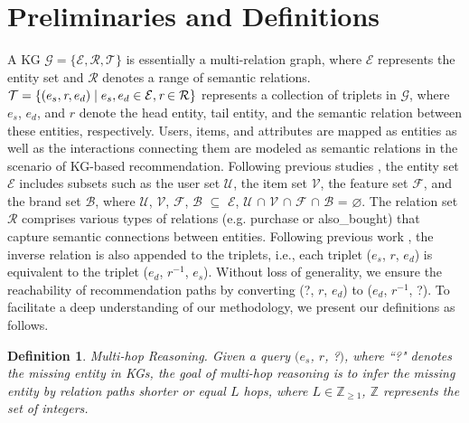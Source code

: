 \documentclass[conference]{IEEEtran}
\newtheorem{defn}{Definition}
\begin{document}
\section{Preliminaries and Definitions}
A KG  
	\begin{math}
		\mathcal{G} = \{\mathcal{E}, \mathcal{R}, \mathcal{T}\} 
	\end{math} is essentially a multi-relation graph, where $\mathcal{E}$ represents the entity set and $\mathcal{R}$ denotes a range of semantic relations.
	\begin{math}
		\mathcal{T} = \{ (\emph{$e_s$}, \emph{r}, \emph{$e_d$}) \mid \emph{$e_s$}, \emph{$e_d$} \in \mathcal{E}, \emph{r} \in \mathcal{R} \} 
	\end{math} represents a collection of triplets in $\mathcal{G}$, where $e_s$, $e_d$, and $r$ denote the  head entity, tail entity, and the semantic relation between these entities, respectively.  Users, items, and attributes are mapped as entities as well as the interactions connecting them are modeled as semantic relations in the scenario of KG-based recommendation. Following previous studies \cite{UCPR} \cite{CAFE}, the entity set $\mathcal{E}$ includes subsets such as the user set $\mathcal{U}$, the item set $\mathcal{V}$, the feature set $\mathcal{F}$, and the brand set $\mathcal{B}$, where $\mathcal{U}$, $\mathcal{V}$, $\mathcal{F}$, $\mathcal{B}$ $\subseteq$ $\mathcal{E}$, $\mathcal{U}$  $\cap$  $\mathcal{V}$ $\cap$  $\mathcal{F}$ $\cap$  $\mathcal{B}$ =  $\varnothing$. The relation set $\mathcal{R}$ comprises  various types of relations (e.g.  purchase or also\_bought) that capture semantic connections between entities.  Following previous work \cite{CogER}, the inverse relation is also appended to the triplets, i.e., each triplet (\emph{$e_s$}, \emph{$r$}, \emph{$e_d$}) is equivalent to the triplet (\emph{$e_d$}, \emph{$r^{-1}$}, \emph{$e_s$}). Without loss of generality, we ensure the reachability of recommendation paths by converting (?, \emph{$r$}, \emph{$e_d$}) to (\emph{$e_d$}, \emph{$r^{-1}$}, ?). To facilitate a deep understanding of our methodology, we present our definitions as follows.

 \begin{defn}
	\label{def:activity}
		\emph{Multi-hop Reasoning}. Given a query $($\emph{$e_s$}, \emph{$r$}, ?$)$, where ``?" denotes the missing entity in KGs, the goal of multi-hop reasoning is to infer the missing entity by relation paths shorter or equal $L$ hops, where $L \in \mathbb{Z}_{\geq 1}$, $\mathbb{Z}$ represents the set of integers.

\end{defn}
\end{document}
